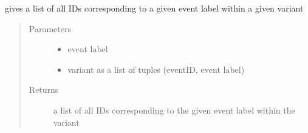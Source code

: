 \documentclass[letterpaper,10pt,english]{sphinxmanual}
\begin{document}

\begin{fulllineitems}
\label{\detokenize{cost function:costFunction.mappings.getPositionsLabel}}
gives a list of all IDs corresponding to a given event label within a given variant
\begin{quote}\begin{description}
\item[{Parameters}] \leavevmode\begin{itemize}
\item {} 
 \textendash{} event label

\item {} 
 \textendash{} variant as a list of tuples (eventID, event label)

\end{itemize}

\item[{Returns}] \leavevmode
a list of all IDs corresponding to the given event label within the variant

\end{description}\end{quote}

\end{fulllineitems}

\end{document}
